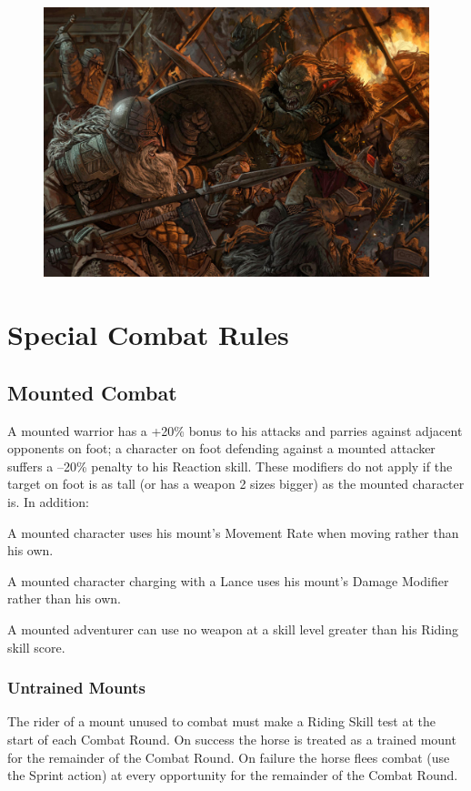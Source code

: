 \begin{figure}
\begin{center}
\includegraphics[scale=0.49]{img/the_last_stand_by_ncorva.jpg}
\end{center}
\end{figure}


\section{Special Combat Rules}

\subsection{Mounted Combat}
A mounted warrior has a +20\% bonus to his attacks and parries against adjacent opponents on foot; a character on foot defending against a mounted attacker suffers a –20\% penalty to his Reaction skill. These modifiers do not apply if the target on foot is as tall (or has a weapon 2 sizes bigger) as the mounted character is. In addition:
\begin{rpg-list}
\item A mounted character uses his mount’s Movement Rate when moving rather than his own.
\item A mounted character charging with a Lance uses his mount’s Damage Modifier rather than his own.
\item A mounted adventurer can use no weapon at a skill level greater than his Riding skill score. 
\end{rpg-list}

\subsubsection{Untrained Mounts}
The rider of a mount unused to combat must make a Riding Skill test at the start of each Combat Round.
On success the horse is treated as a trained mount for the remainder of the Combat Round. 
On failure the horse flees combat (use the Sprint action) at every opportunity for the remainder of the Combat Round. 


